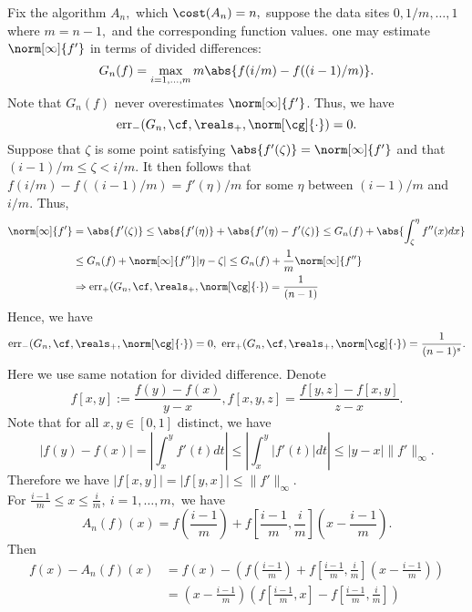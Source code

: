 Fix the algorithm $A_n,$ which $\cost(A_n)=n,$
suppose the data sites $0, 1/m, \dots, 1$ where $m=n-1,$ and the corresponding function values. one may estimate $\norm[\infty]{f'}$ in terms of divided differences:
\begin{equation}
G_{n}(f)= \max_{i=1, \ldots, m} m\abs{f(i/m)-f((i-1)/m)}.
\end{equation}
Note that $G_n(f)$ never overestimates $\norm[\infty]{f'}$. Thus, we have
$$\err_{-}(G_n,\cf,\reals_{+},\norm[\cg]{\cdot})=0.$$
 Suppose that $\zeta$ is some point satisfying $\abs{f'(\zeta)} = \norm[\infty]{f'}$ and
that $(i-1)/m \le \zeta < i/m$.  It then follows that $f(i/m)-f((i-1)/m) = f'(\eta)/m$ for some $\eta$ between $(i-1)/m$ and $i/m$.  Thus,
\begin{align*}
\norm[\infty]{f'} &= \abs{f'(\zeta)}\leq \abs{f'(\eta)} + \abs{f'(\eta)-f'(\zeta) }  \le G_{n}(f) + \abs{\int_\zeta^\eta f''(x)dx }\nonumber\\
& \leq  G_n(f) + \norm[\infty]{f''}|\eta-\zeta| \leq G_n(f)+ \frac{1}{m}\norm[\infty]{f''}\nonumber\\
&\Rightarrow \err_{+}(G_n,\cf,\reals_{+},\norm[\cg]{\cdot}) =\frac{1}{(n-1)}
\end{align*}
Hence, we have
$$\err_{-}(G_n,\cf,\reals_{+},\norm[\cg]{\cdot})=0, \ \err_{+}(G_n,\cf,\reals_{+},\norm[\cg]{\cdot}) =\frac{1}{(n-1)^{s}}.
$$
Here we use same notation for divided difference. Denote
$$f[x,y]:=\frac{f(y)-f(x)}{y-x},f[x,y,z]=\frac{f[y,z]-f[x,y]}{z-x}.$$
Note that for all $x,y \in [0,1]$ distinct, we have
 $$|f(y)-f(x)|=\left|\int_{x}^{y}f'(t)dt\right|\leq \left|\int_{x}^{y}\left|f'(t)\right|dt\right|
 \leq |y-x|\|f'\|_{\infty}.$$
 Therefore we have $|f[x,y]|=|f[y,x]|\leq \|f'\|_{\infty}.$\\
For $\frac{i-1}{m} \leq x \leq \frac{i}{m}, \ i=1, \ldots, m,$ we have
$$A_{n}(f)(x)=f\left(\frac{i-1}{m}\right)+f\left[\frac{i-1}{m},\frac{i}{m}\right]\left(x-\frac{i-1}{m}\right).$$
Then
\begin{align*}
f(x)-A_{n}(f)(x)
&
= f(x)-\left(f\left(\frac{i-1}{m}\right)+f\left[\frac{i-1}{m},\frac{i}{m}\right]\left(x-\frac{i-1}{m}\right)\right)\\
&
=\left(x-\frac{i-1}{m}\right)\left(f\left[\frac{i-1}{m},x\right]-f\left[\frac{i-1}{m},\frac{i}{m}\right]\right)
\end{align*}

